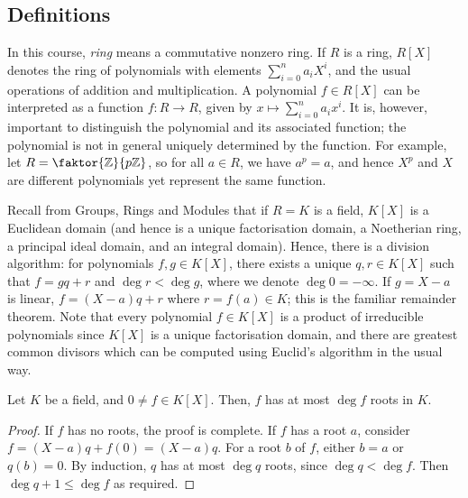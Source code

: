 \subsection{Definitions}
In this course, \emph{ring} means a commutative nonzero ring.
If \( R \) is a ring, \( R[X] \) denotes the ring of polynomials with elements \( \sum_{i=0}^n a_i X^i \), and the usual operations of addition and multiplication.
A polynomial \( f \in R[X] \) can be interpreted as a function \( f \colon R \to R \), given by \( x \mapsto \sum_{i=0}^n a_i x^i \).
It is, however, important to distinguish the polynomial and its associated function; the polynomial is not in general uniquely determined by the function.
For example, let \( R = \faktor{\mathbb Z}{p\mathbb Z} \), so for all \( a \in R \), we have \( a^p = a \), and hence \( X^p \) and \( X \) are different polynomials yet represent the same function.

Recall from Groups, Rings and Modules that if \( R = K \) is a field, \( K[X] \) is a Euclidean domain (and hence is a unique factorisation domain, a Noetherian ring, a principal ideal domain, and an integral domain).
Hence, there is a division algorithm: for polynomials \( f, g \in K[X] \), there exists a unique \( q, r \in K[X] \) such that \( f = gq + r \) and \( \deg r < \deg g \), where we denote \( \deg 0 = -\infty \).
If \( g = X - a \) is linear, \( f = (X-a)q + r \) where \( r = f(a) \in K \); this is the familiar remainder theorem.
Note that every polynomial \( f \in K[X] \) is a product of irreducible polynomials since \( K[X] \) is a unique factorisation domain, and there are greatest common divisors which can be computed using Euclid's algorithm in the usual way.

\begin{proposition}
	Let \( K \) be a field, and \( 0 \neq f \in K[X] \).
	Then, \( f \) has at most \( \deg f \) roots in \( K \).
\end{proposition}
\begin{proof}
	If \( f \) has no roots, the proof is complete.
	If \( f \) has a root \( a \), consider \( f = (X - a)q + f(0) = (X - a)q \).
	For a root \( b \) of \( f \), either \( b = a \) or \( q(b) = 0 \).
	By induction, \( q \) has at most \( \deg q \) roots, since \( \deg q < \deg f \).
	Then \( \deg q + 1 \leq \deg f \) as required.
\end{proof}


